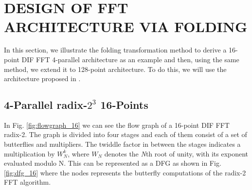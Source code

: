 \documentclass[journal,comsoc]{IEEEtran}
\begin{document}
\section{DESIGN OF FFT ARCHITECTURE VIA FOLDING}

In this section, we illustrate the folding transformation method to derive a 16-point DIF FFT 4-parallel architecture as an example and then, using the same method, we extend it to 128-point architecture. To do this, we will use the architecture proposed in \cite{ayinala_pipelined_2012}.
\subsection{4-Parallel radix-$2^3$ 16-Points}
In Fig. \ref{fig:flowgraph_16}  we can see the flow graph of a 16-point DIF FFT radix-2. The graph is divided into four stages and each of them consist of a set of butterflies and multipliers. The twiddle factor in between the stages indicates a multiplication by $W^k_N$, where $W_N$ denotes the \textit{N}th root of unity, with its exponent evaluated modulo N. This can be represented as a DFG as shown in Fig. \ref{fig:dfg_16} where the nodes represents the butterfly computations of the radix-2 FFT algorithm. 
\end{document}
